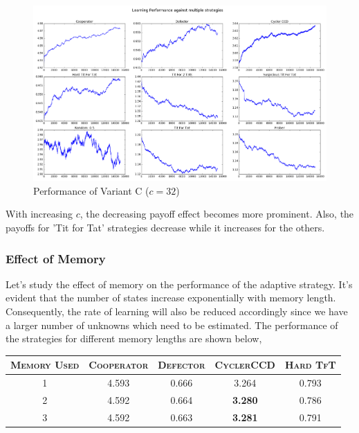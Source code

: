 \documentclass[a4paper]{article}
\begin{document}
	\begin{figure}[H]
	\centering
	\includegraphics[width=\textwidth]{learnerInitialC_b32.png}
	\caption*{{Performance of Variant C ($c = 32$)}}
	\end{figure}

	With increasing $c$, the decreasing payoff effect becomes more prominent. Also, the payoffs for 'Tit for Tat' strategies decrease while it increases for the others.

	\subsubsection{Effect of Memory}
	
	Let's study the effect of memory on the performance of the adaptive strategy. It's evident that the number of states increase exponentially with memory length.	Consequently, the rate of learning will also be reduced accordingly since we have a larger number of unknowns which need to be estimated. The performance of the strategies for different memory lengths are shown below,\\
	
	\begin{table}[H]
	  \begin{center}
	    \begin{tabular}{|c|c|c|c|c|}
	      \toprule
		  \textsc{Memory Used} & \textsc{Cooperator} & \textsc{Defector} & {\footnotesize{\textsc{CyclerCCD}}} & \textsc{Hard TfT}\\
	      \midrule
		   1 & 	4.593 & 0.666 & 3.264 & 0.793\\
		   2 & 4.592 & 0.664 & \textbf{3.280} & 0.786\\
		   3 & 4.592 & 0.663 & \textbf{3.281} & 0.791\\
		   \bottomrule
	    \end{tabular}
	  \end{center}
	\end{table}  		
\end{document}
